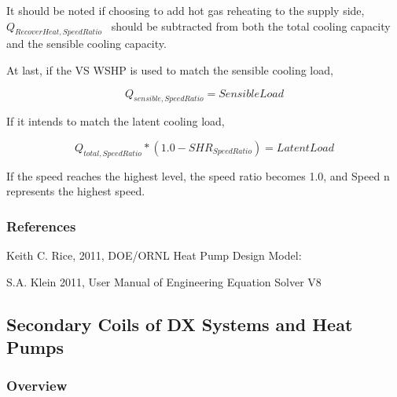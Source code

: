 It should be noted if choosing to add hot gas reheating to the supply side, \({Q_{RecoverHeat,SpeedRatio}}\) ~should be subtracted from both the total cooling capacity and the sensible cooling capacity.

At last, if the VS WSHP is used to match the sensible cooling load,

\begin{equation}
{Q_{sensible,SpeedRatio}} = SensibleLoad
\end{equation}

If it intends to match the latent cooling load,

\begin{equation}
{Q_{total,SpeedRatio}}*\left( {1.0 - SH{R_{SpeedRatio}}} \right) = LatentLoad
\end{equation}

If the speed reaches the highest level, the speed ratio becomes 1.0, and Speed n represents the highest speed.

\subsubsection{References}\label{references-9}

Keith C. Rice, 2011, DOE/ORNL Heat Pump Design Model:

S.A. Klein 2011, User Manual of Engineering Equation Solver V8

\subsection{Secondary Coils of DX Systems and Heat Pumps}\label{secondary-coils-of-dx-systems-and-heat-pumps}

\subsubsection{Overview}\label{overview-15}

